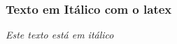 \begin{frame}[t]
  \frametitle{Texto em Itálico com o latex}
  \textit{Este texto está em itálico}
\end{frame}

